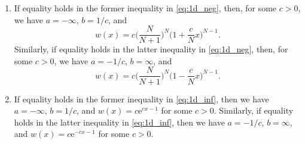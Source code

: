 \documentclass[10pt,a4paper]{amsart}
\newcommand{\e}{\mathrm{e}}
\begin{document}
\begin{lemma}[Rigidity on intervals; $N<-1$, $N=\infty$]\label{lm:=_inf}
\begin{enumerate}[{\rm (i)}]
\item\label{1d=_neg}
If equality holds in the former inequality in \eqref{eq:1d_neg},
then, for some $c>0$, we have $a=-\infty$, $b=1/c$, and
\begin{equation}\label{eq:=_inf}
w(x) =c \biggl( \frac{N}{N+1} \biggr)^N \biggl( 1+\frac{c}{N}x \biggr)^{N-1}.
\end{equation}
Similarly, if equality holds in the latter inequality in \eqref{eq:1d_neg},
then, for some $c>0$, we have $a=-1/c$, $b=\infty$, and
\[
w(x) =c \biggl( \frac{N}{N+1} \biggr)^N \biggl( 1-\frac{c}{N}x \biggr)^{N-1}.
\]

\item\label{1d=_inf}
If equality holds in the former inequality in \eqref{eq:1d_inf},
then we have $a=-\infty$, $b=1/c$, and $w(x)=c \e^{cx-1}$ for some $c>0$.
Similarly, if equality holds in the latter inequality in \eqref{eq:1d_inf},
then we have $a=-1/c$, $b=\infty$, and $w(x)=c \e^{-cx-1}$ for some $c>0$.
\end{enumerate}
\end{lemma}
\end{document}
